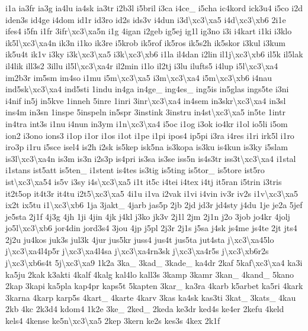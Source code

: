{i1a ia3fr ia3g ia4lu ia4sk ia3tr i2b3l i5bril i3ca i4ce\-\_\- i5cha ic4kord ick3u4 i5co i2d iden3s id4ge i4dom id1r id3ro id2s ids3v i4dun i3d\textbackslash{}xc3\textbackslash{}xa5 i4d\textbackslash{}xc3\textbackslash{}xb6 2i1e ifes4 i5fn i1fr 3ifr\textbackslash{}xc3\textbackslash{}xa5n i1g 4igan i2geb ig5ej ig1l ig3no i3i i4kart i1ki i3klo ik5l\textbackslash{}xc3\textbackslash{}xa4n ik3n i1ko ik3re i5krob ik5rof ik5ros ik5s2h ik5skor i3kul i3kum ik5u4t ik1v i3ky i3k\textbackslash{}xc3\textbackslash{}xa5 i3k\textbackslash{}xc3\textbackslash{}xb6 i1la il4dan i2lin il1j\textbackslash{}xc3\textbackslash{}xb6 il5k il5lak il4lik ill3s2 3illu il5l\textbackslash{}xc3\textbackslash{}xa4r il2min i1lo il2tj i3lu ilufts5 i4lup i5l\textbackslash{}xc3\textbackslash{}xa4 im2b3r im5sm im4so i1mu i5m\textbackslash{}xc3\textbackslash{}xa5 i3m\textbackslash{}xc3\textbackslash{}xa4 i5m\textbackslash{}xc3\textbackslash{}xb6 i4nau ind5sk\textbackslash{}xc3\textbackslash{}xa4 ind5sti 1indu in4ga in4ge\-\_\- ing4es\-\_\- ing5is in5glas ings5te i3ni i4nif in5j in5kve 1inneh 5inre 1inri 3inr\textbackslash{}xc3\textbackslash{}xa4 in4sem in3skr\textbackslash{}xc3\textbackslash{}xa4 in3sl ins4m in3sn 1inspe 5inspeln in5spr 3instink 3instru in4st\textbackslash{}xc3\textbackslash{}xa5 in5te 1intr in4tra int3s i1nu i4nun in3ym i1n\textbackslash{}xc3\textbackslash{}xa4 i5oc i1og i3ok io4kr i1ol io5li i5om ion2 i3ono ions3 i1op i1or i1os i1ot i1pe i1pi ipos4 ip5pi i3ra i4res i1ri irk5l i1ro iro3p i1ru i5sce isel4 is2h i2sk is5kep isk5na is3kopa is3ku is4kun is3ky i5slam is3l\textbackslash{}xc3\textbackslash{}xa4n is3m is3n i2s3p is4pri is3sa is3se iss5n is4s3tr iss3t\textbackslash{}xc3\textbackslash{}xa4 i1stal i1stans ist5att is5ten\-\_\- i1stent is4tes is3tig is5ting is5tor\-\_\- is5tore ist5ro ist\textbackslash{}xc3\textbackslash{}xa54 is5v i3sy i4s\textbackslash{}xc3\textbackslash{}xa5 i1t it5c i4tei i4tex i4tj it5ran i5trin i3tris it2t5op it4t3r it4tu i2t5\textbackslash{}xc3\textbackslash{}xa5 4i1u i1va i2vak i1vi i4vin iv3r iv2s i1v\textbackslash{}xc3\textbackslash{}xa5 ix2t ix5tu i1\textbackslash{}xc3\textbackslash{}xb6 1ja 3jakt\-\_\- 4jarb jas5p 2jb 2jd jd3r jd4sty j4du 1je je2a 5jef je5sta 2j1f 4j3g 4jh 1ji 4jin 4jk j4kl j3ko jk3v 2j1l 2jm 2j1n j2o 3job jo4kr 4jolj jo5l\textbackslash{}xc3\textbackslash{}xb6 jor4din jord3s4 3jou 4jp j5pl 2j3r 2j1s j5sa j4sk js4me js4te 2jt jts4 2j2u ju4kos juk3s jul3k 4jur jus5kr juss4 jus4t jus5ta jut4sta j\textbackslash{}xc3\textbackslash{}xa45lo j\textbackslash{}xc3\textbackslash{}xa4l4p5r j\textbackslash{}xc3\textbackslash{}xa4l4sa j\textbackslash{}xc3\textbackslash{}xa4rn3sk j\textbackslash{}xc3\textbackslash{}xa4r5s j\textbackslash{}xc3\textbackslash{}xb6r2s j\textbackslash{}xc3\textbackslash{}xb6s4t 5j\textbackslash{}xc3\textbackslash{}xa9 1k2a 3ka\-\_\- 3kad\-\_\- 3kade\-\_\- ka4dr 2kaf 5kaf\textbackslash{}xc3\textbackslash{}xa4 ka3i ka5ju 2kak k3akti 4kalf 4kalg kal4lo kall3s 3kamp 3kamr 3kan\-\_\- 4kand\-\_\- 5kano 2kap 3kapi ka5pla kap4pr kaps5t 5kapten 3kar\-\_\- ka3ra 4karb k5arbet ka5ri 4kark 3karna 4karp karp5s 4kart\-\_\- 4karte 4karv 3kas ka4sk kas3ti 3kat\-\_\- 3kats\-\_\- 4kau 2kb 4kc 2k3d4 kdom4 1k2e 3ke\-\_\- 2ked\-\_\- 2keda ke3dr ked4s ke4er 2kefu 4keld kels4 4kense ke5n\textbackslash{}xc3\textbackslash{}xa5 2kep 3kern ke2s kes3s 4kex 2k1f }
